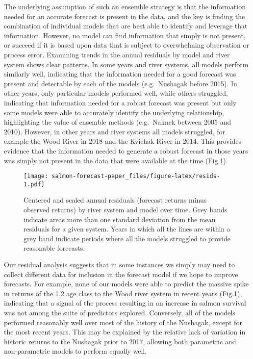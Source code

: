 \documentclass[
]{article}
\begin{document}
The underlying assumption of such an ensemble strategy is that the information needed for an accurate forecast is present in the data, and the key is finding the combination of individual models that are best able to identify and leverage that information. However, no model can find information that simply is not present, or succeed if it is based upon data that is subject to overwhelming observation or process error. Examining trends in the annual residuals by model and river system shows clear patterns. In some years and river systems, all models perform similarly well, indicating that the information needed for a good forecast was present and detectable by each of the models (e.g.~Nushagak before 2015). In other years, only particular models performed well, while others struggled, indicating that information needed for a robust forecast was present but only some models were able to accurately identify the underlying relationship, highlighting the value of ensemble methods (e.g.~Naknek between 2005 and 2010). However, in other years and river systems all models struggled, for example the Wood River in 2018 and the Kvichak River in 2014. This provides evidence that the information needed to generate a robust forecast in those years was simply not present in the data that were available at the time (Fig.\ref{fig:resids}).

\begin{figure}
\centering
\texttt{[image: salmon-forecast-paper\_files/figure-latex/resids-1.pdf]}
\caption{\label{fig:resids}Centered and scaled annual residuals (forecast returns minus observed returns) by river system and model over time. Grey bands indicate areas more than one standard deviation from the mean residuals for a given system. Years in which all the lines are within a grey band indicate periods where all the models struggled to provide reasonable forecasts.}
\end{figure}

Our residual analysis suggests that in some instances we simply may need to collect different data for inclusion in the forecast model if we hope to improve forecasts. For example, none of our models were able to predict the massive spike in returns of the 1.2 age class to the Wood river system in recent years (Fig.\ref{fig:resids}), indicating that a signal of the process resulting in an increase in salmon survival was not among the suite of predictors explored. Conversely, all of the models performed reasonably well over most of the history of the Nushagak, except for the most recent years. This may be explained by the relative lack of variation in historic returns to the Nushagak prior to 2017, allowing both parametric and non-parametric models to perform equally well.
\end{document}
